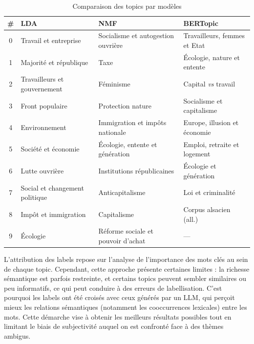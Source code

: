 \documentclass{article}
\begin{document}
\begin{table}[h]
  \caption{Comparaison des topics par modèles}
  \label{tab:topics}
  \centering
  \small
  \begin{tabular}{clll}
    \toprule
    \# & LDA & NMF & BERTopic \\
    \midrule
    0 & Travail et entreprise            & Socialisme et autogestion ouvrière       & Travailleurs, femmes et Etat \\
    1 & Majorité et république           & Taxe      & Écologie, nature et entente  \\
    2 & Travailleurs et gouvernement     &  Féminisme              & Capital \textit{vs} travail          \\
    3 & Front populaire                  & Protection nature           & Socialisme et capitalisme            \\
    4 & Environnement                    & Immigration et impôts nationale       & Europe, illusion et économie         \\
    5 & Société et économie              & Écologie, entente et génération          & Emploi, retraite et logement         \\
    6 & Lutte ouvrière   & Institutions républicaines               & Écologie et génération               \\
    7 & Social et changement politique   & Anticapitalisme & Loi et criminalité                   \\
    8 & Impôt et immigration             & Capitalisme      & Corpus alsacien (all.)               \\
    9 & Écologie                         & Réforme sociale et pouvoir d'achat       & ---                                  \\
    \bottomrule
  \end{tabular}
\end{table}



L'attribution des labels repose sur l'analyse de l'importance des mots clés au sein de chaque topic. Cependant, cette approche présente certaines limites : la richesse sémantique est parfois restreinte, et certains topics peuvent sembler similaires ou peu informatifs, ce qui peut conduire à des erreurs de labellisation. C'est pourquoi les labels ont été croisés avec ceux générés par un LLM, qui perçoit mieux les relations sémantiques (notamment les cooccurrences lexicales) entre les mots. Cette démarche vise à obtenir les meilleurs résultats possibles tout en limitant le biais de subjectivité auquel on est confronté face à des thèmes ambigus.
\end{document}
